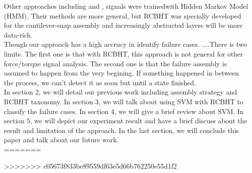 \indent Other approaches including \cite{rodriguez2011abort} and \cite{di2013bayesian}, signals were trainedwith Hidden Markov Model (HMM). Their methods are more general, but RCBHT was specially developed for the cantilever-snap assembly and increasingly abstracted layers will be more data-rich. \\
\indent Though our approach has a high accrucy in identify failure cases. ....There is two limits. The first one is that with RCBHT, this approach is not general for other force/torque signal analysis. The second one is that the failure assembly is assumed to happen from the very begining. If something happened in between the process, we can't detect it as soon but until a state finished. \\
\indent In section 2, we will detail our previous work including assembly strategy and RCBHT taxonomy. In section 3, we will talk about using SVM with RCBHT to classify the failure cases. In section 4, we will give a brief review about SVM. In section 5, we will depict our experiment result and have a brief discuss about the result and limitation of the approach. In the last section, we will conclude this paper and talk about our future work. \\
=======
%

>>>>>>> c05673f833be89559df63e5d66b762250e55d1f2

